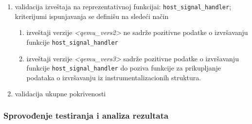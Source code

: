 \documentclass[12pt,oneside]{memoir}
\newcommand{\kod}[1]{\texttt{#1}}
\newcommand{\strano}[1]{\textit{#1}}
\begin{document}
\begin{enumerate}
\begin{enumerate}
\item validacija izveštaja na reprezentativnoj funkcijai: \kod{host\_signal\_handler}; kriterijumi ispunjavanja se definišu na sledeći način
\begin{enumerate}
\item izveštaji verzije \strano{<qemu\_vers2>} ne sadrže pozitivne podatke o izvršavanju funkcije \kod{host\_signal\_handler}
\item izveštaji verzije \strano{<qemu\_vers3>} sadrže pozitivne podatke o izvršavanju funkcije \kod{host\_signal\_handler} do poziva funkcije za prikupljanje podataka o izvršavanju iz instrumentalizacionih struktura.
\end{enumerate}

\item validacija ukupne pokrivenosti 
\end{enumerate}

\end{enumerate}


\subsubsection{Sprovođenje testiranja i analiza rezultata}
\end{document}
